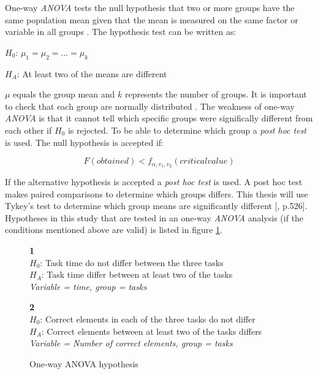 One-way \textit{ANOVA} tests the null hypothesis that two or more groups have the same population mean given that the mean is measured on the same factor or variable in all groups \citep{LundResearchLtd2013a}. The hypothesis test can be written as:\newline

\centerline{$H_{0}$:  $\mu_{1} =  \mu_{2} = ... = \mu_{k} $} 
\centerline{$H_{A}$:  At least two of the means are different}

$\mu$ equals the group mean and $k$ represents the number of groups. It is important to check that each group are normally distributed \citep{LundResearchLtd2013a}. The weakness of one-way \textit{ANOVA} is that it cannot tell which specific groups were significally different from each other if $H_{0}$ is rejected. To be able to determine which group a \textit{post hoc test} is used. The null hypothesis is accepted if:

\begin{equation}
\label{eq:anova_reject}
F (obtained) < f_{\alpha, v_{1}, v_{2}} (critical value)
\end{equation}

If the alternative hypothesis is accepted a \textit{post hoc test} is used. A post hoc test makes paired comparisons to determine which groups differs. This thesis will use Tykey's test to determine which group means are significantly different [\citep{Walpole2012}, p.526]. Hypotheses in this study that are tested in an one-way \textit{ANOVA} analysis (if the conditions mentioned above are valid) is listed in figure \ref{fig:hypothesis_anova}. 

\begin{figure}[H]
	\begin{framed}\centering
		\textbf{1}\\
		$H_{0}$: Task time do not differ between the three tasks\\
		$H_{A}$: Task time differ between at least two of the tasks\\
		\textit{Variable = time, group = tasks}\newline
		
		\textbf{2}\\
		$H_{0}$: Correct elements in each of the three tasks do not differ\\
		$H_{A}$: Correct elements between at least two of the tasks differs \\
		\textit{Variable = Number of correct elements, group = tasks}
		
	\end{framed}
	\caption{One-way ANOVA hypothesis}
	\label{fig:hypothesis_anova}
\end{figure}

